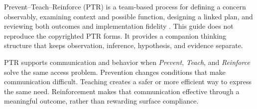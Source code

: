 

Prevent--Teach--Reinforce (PTR) is a team-based process for defining a concern observably, examining context and possible function, designing a linked plan, and reviewing both outcomes and implementation fidelity \citep{dunlap2019ptr}. This guide does not reproduce the copyrighted PTR forms. It provides a companion thinking structure that keeps observation, inference, hypothesis, and evidence separate.

PTR supports communication and behavior when \textit{Prevent}, \textit{Teach}, and \textit{Reinforce} solve the same access problem. Prevention changes conditions that make communication difficult. Teaching creates a safer or more efficient way to express the same need. Reinforcement makes that communication effective through a meaningful outcome, rather than rewarding surface compliance.



